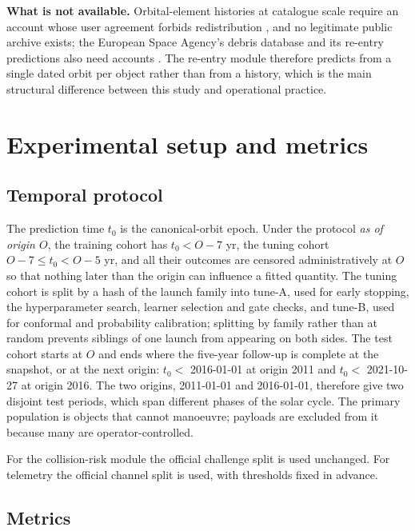 \documentclass[3p,times]{elsarticle}
\begin{document}
\textbf{What is not available.} Orbital-element histories at catalogue
scale require an account whose user agreement forbids redistribution
\citep{spacetrack2019agreement}, and no legitimate public archive
exists; the European Space Agency's debris database and its re-entry
predictions also need accounts
\citep{klinkrad1991discos, esa2026reentry}. The re-entry module
therefore predicts from a single dated orbit per object rather than from
a history, which is the main structural difference between this study
and operational practice.

\section{Experimental setup and metrics}\label{sec:setup}

\subsection{Temporal protocol}\label{temporal-protocol}

The prediction time \(t_0\) is the canonical-orbit epoch. Under the
protocol \emph{as of origin \(O\)}, the training cohort has
\(t_0 < O - 7\) yr, the tuning cohort \(O - 7 \leq t_0 < O - 5\) yr, and
all their outcomes are censored administratively at \(O\) so that
nothing later than the origin can influence a fitted quantity. The
tuning cohort is split by a hash of the launch family into tune-A, used
for early stopping, the hyperparameter search, learner selection and
gate checks, and tune-B, used for conformal and probability calibration;
splitting by family rather than at random prevents siblings of one
launch from appearing on both sides. The test cohort starts at \(O\) and
ends where the five-year follow-up is complete at the snapshot, or at
the next origin: \(t_0 <\) 2016-01-01 at origin 2011 and \(t_0 <\)
2021-10-27 at origin 2016. The two origins, 2011-01-01 and 2016-01-01,
therefore give two disjoint test periods, which span different phases of
the solar cycle. The primary population is objects that cannot
manoeuvre; payloads are excluded from it because many are
operator-controlled.

For the collision-risk module the official challenge split is used
unchanged. For telemetry the official channel split is used, with
thresholds fixed in advance.

\subsection{Metrics}\label{metrics}
\end{document}
